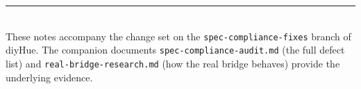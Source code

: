 \documentclass[11pt,a4paper]{article}
\begin{document}
\vfill
\noindent\rule{\linewidth}{0.4pt}\\
\footnotesize These notes accompany the change set on the
\texttt{spec-compliance-fixes} branch of \textsf{diyHue}. The companion
documents \texttt{spec-compliance-audit.md} (the full defect list) and
\texttt{real-bridge-research.md} (how the real bridge behaves) provide the
underlying evidence.
\end{document}
